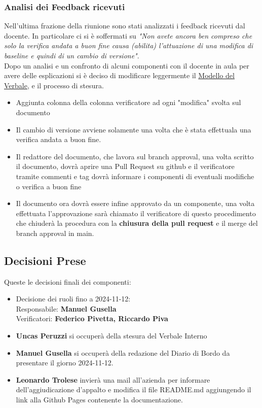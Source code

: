 \documentclass[10pt]{article}
\begin{document}
\subsubsection{Analisi dei Feedback ricevuti}
Nell'ultima frazione della riunione sono stati analizzati i feedback ricevuti dal docente. In particolare ci si è soffermati su \textit{"Non avete ancora ben compreso che
solo la verifica andata a buon fine
causa (abilita) l'attuazione di una
modifica di baseline e quindi di un
cambio di versione"}. \\
Dopo un analisi e un confronto di alcuni componenti con il docente in aula per avere delle esplicazioni si è deciso di modificare leggermente il \href{https://github.com/SevenBitsSwe/7BitsDocs/blob/main/ModelloVerbale.tex}{Modello del Verbale}, e il processo di stesura.
\begin{itemize}
    \item Aggiunta colonna della colonna verificatore ad ogni "modifica" svolta sul documento
    \item Il cambio di versione avviene solamente una volta che è stata effettuala una verifica andata a buon fine.
    \item Il redattore del documento, che lavora sul branch approval, una volta scritto il documento, dovrà aprire una Pull Request su github e il verificatore tramite commenti e tag dovrà informare i componenti di eventuali modifiche o verifica a buon fine
    \item Il documento ora dovrà essere infine approvato da un componente, una volta effettuata l'approvazione sarà chiamato il verificatore di questo procedimento che chiuderà la procedura con la \textbf{chiusura della pull request} e il merge del branch approval in main. 
\end{itemize}
\subsection{Decisioni Prese}
Queste le decisioni finali dei componenti:
\begin{itemize}
    \item Decisione dei ruoli fino a 2024-11-12: \\ Responsabile: \textbf{Manuel Gusella} \\ Verificatori: \textbf{Federico Pivetta, Riccardo Piva}
    \item \textbf{Uncas Peruzzi} si occuperà della stesura del Verbale Interno
    \item \textbf{Manuel Gusella} si occuperà della redazione del Diario di Bordo da presentare il giorno 2024-11-12.
    \item \textbf{Leonardo Trolese} invierà una mail all'azienda per informare dell'aggiudicazione d'appalto e modifica il file README.md aggiungendo il link alla Github Pages contenente la documentazione.


\end{itemize}
\end{document}
